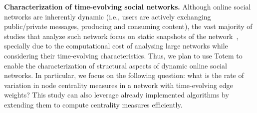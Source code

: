 {\bf Characterization of time-evolving social networks.} Although online social networks are inherently dynamic (i.e., users are actively exchanging public/private messages, producing and consuming content), the vast majority of studies that analyze such network focus on static snapshots of the network~\cite{Willinger2009}, specially due to the computational cost of analysing large networks while considering their time-evolving characteristics. Thus, we plan to use {\sc Totem} to enable the characterization of structural aspects of dynamic online social networks. In particular, we focus on the following question: what is the rate of variation in node centrality measures in a network with time-evolving edge weights? This study can also leverage already implemented algorithms by extending them to compute centrality measures efficiently.
